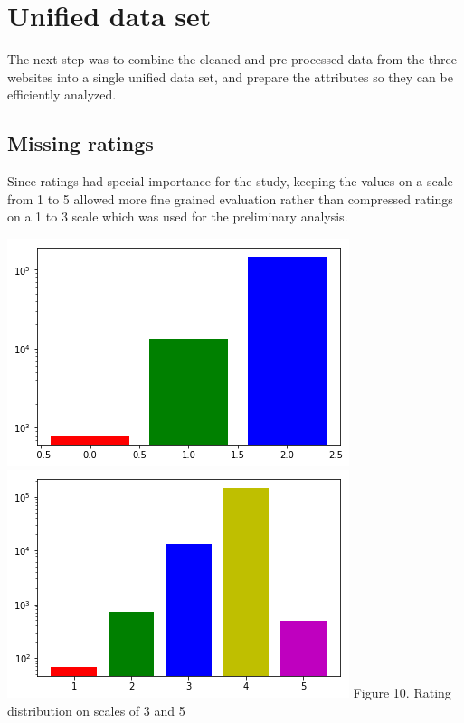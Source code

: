 \documentclass[11pt]{article}
\begin{document}
\section{Unified data set}

The next step was to combine the cleaned and pre-processed data from the three websites into a single unified data set, and prepare the attributes so they can be efficiently analyzed.

\subsection{Missing ratings}

Since ratings had special importance for the study, keeping the values on a scale from 1 to 5 allowed more fine grained evaluation rather than compressed ratings on a 1 to 3 scale which was used for the preliminary analysis.

\vspace{5mm}
\begin{center}
\includegraphics[scale=0.25]{rating-1-to-3}
\includegraphics[scale=0.25]{rating-1-to-5}
\label{visalization-cookingtime} Figure 10. Rating distribution on scales of 3 and 5
\end{center}
\vspace{5mm}
\end{document}
